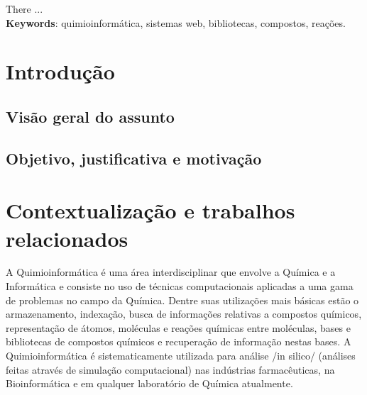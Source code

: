 \documentclass{abnt}
\begin{document}





 

\capa
\folhaderosto

\begin{resumo}
There ...\\

\textbf{Keywords}: quimioinformática, sistemas web, bibliotecas, compostos, reações.
\end{resumo}

\sumario
\listoffigures

\chapter{Introdução}

\section{Visão geral do assunto}

\section{Objetivo, justificativa e motivação}

\chapter{Contextualização e trabalhos relacionados}

A Quimioinformática é uma área interdisciplinar que envolve a Química e a Informática
e consiste no uso de técnicas computacionais aplicadas a uma gama de problemas no
campo da Química. Dentre suas utilizações mais básicas estão o armazenamento, indexação,
busca de informações relativas a compostos químicos, representação de átomos, moléculas
e reações químicas entre moléculas, bases e bibliotecas de compostos químicos e
recuperação de informação nestas bases. A Quimioinformática é sistematicamente utilizada
para análise /in silico/ (análises feitas através de simulação computacional) nas
indústrias farmacêuticas, na Bioinformática e em qualquer laboratório de Química
atualmente.
\end{document}

